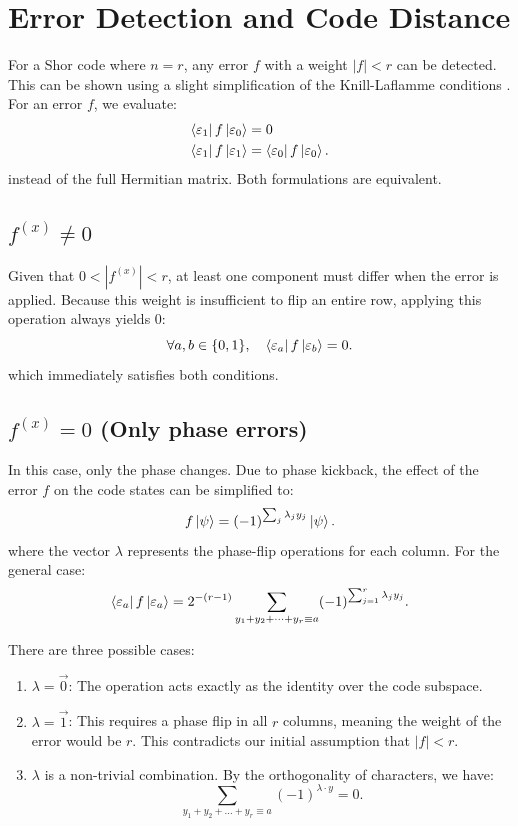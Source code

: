 \section{Error Detection and Code Distance}

For a Shor code where $n = r$, any error $f$ with a weight $|f| < r$ can be detected. This can be shown using a slight simplification of the Knill-Laflamme conditions \citep{Kitaev2002}. For an error $f$, we evaluate:
\begin{align*}
  \bra{\varepsilon_1} f \ket{\varepsilon_0} &= 0\\
  \bra{\varepsilon_1} f \ket{\varepsilon_1} &= \bra{\varepsilon_0} f \ket{\varepsilon_0}
.\end{align*}
instead of the full Hermitian matrix. Both formulations are equivalent.

\subsection{$f^{(x)} \neq 0$}

Given that $0 < |f^{(x)}| < r$, at least one component must differ when the error is applied. Because this weight is insufficient to flip an entire row, applying this operation always yields $0$:
\begin{equation}
  \forall a, b \in \{0, 1\}, \quad \bra{\varepsilon_a} f \ket{\varepsilon_b} = 0
.\end{equation}
which immediately satisfies both conditions.

\subsection{$f^{(x)} = 0$ (Only phase errors)}

In this case, only the phase changes. Due to phase kickback, the effect of the error $f$ on the code states can be simplified to:
\begin{equation}
  f \ket{\psi} = (-1)^{\sum_j \lambda_j y_j}\ket{\psi}
.\end{equation}
where the vector $\lambda$ represents the phase-flip operations for each column. For the general case:
\begin{equation}
  \bra{\varepsilon_a} f \ket{\varepsilon_a} = 2^{-(r - 1)} \sum_{y_1 + y_2 + \dots + y_r \equiv a} (-1)^{\sum_{j = 1}^r \lambda_j y_j}
.\end{equation}

There are three possible cases:
\begin{enumerate}
  \item $\lambda = \vec{0}$: The operation acts exactly as the identity over the code subspace.
  \item $\lambda = \vec{1}$: This requires a phase flip in all $r$ columns, meaning the weight of the error would be $r$. This contradicts our initial assumption that $|f| < r$.
  \item $\lambda$ is a non-trivial combination. By the orthogonality of characters, we have:
    \begin{equation}
      \sum_{y_1 + y_2 + \dots + y_r \equiv a} (-1)^{\lambda \cdot y} = 0
    .\end{equation}
\end{enumerate}

